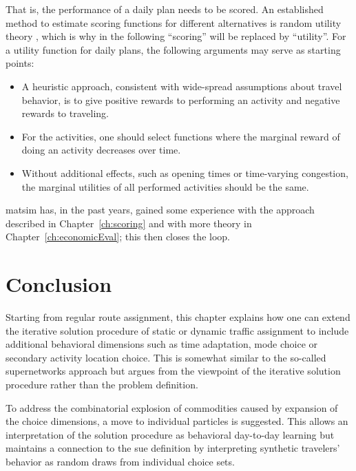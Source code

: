 That is, the performance of a daily plan needs to be scored.  An
established method to estimate scoring functions for different
alternatives is random utility theory \citep[e.g.][]{BenAkivaLerman_1985},
which is why in the following\corr{,}{} ``scoring'' will be replaced by
``utility''.  For a utility function for daily plans, the following
arguments may serve as starting points:
\begin{itemize}

\item A heuristic approach, consistent with wide-spread assumptions
  about travel behavior, is to give positive rewards to performing an
  activity and negative rewards to traveling.

\item For the activities, one should select functions where the
  marginal reward of doing an activity decreases over time.

\item Without additional effects, such as opening times or
  time-varying congestion, the marginal utilities of all performed
  activities should be the same.  

\end{itemize}
\gls{matsim} has, in the past years, gained some experience with the approach 
described in Chapter~\ref{ch:scoring} and with more theory in 
Chapter~\ref{ch:economicEval}; this then closes the loop.  


\section{Conclusion}
\label{sec:agentbased-dta-conclusion}

Starting from regular route assignment,
this chapter explains how one can extend the
iterative solution procedure of static or dynamic traffic assignment
to include additional behavioral dimensions\corr{,}{} such as time adaptation,
mode choice\corr{,}{} or secondary activity location choice.  This is somewhat
similar to the so-called supernetworks approach\corr{,} but argues from the
viewpoint of the iterative solution procedure\corr{,}{} rather than the
problem definition.

To address the combinatorial explosion of commodities
caused by  expansion of the choice dimensions,
a move to individual particles is suggested.  This allows an interpretation of the
solution procedure as behavioral day-to-day learning\corr{,}{} but maintains a
connection to the \gls{sue} definition by interpreting synthetic
travelers' behavior as random draws from individual choice sets.  

